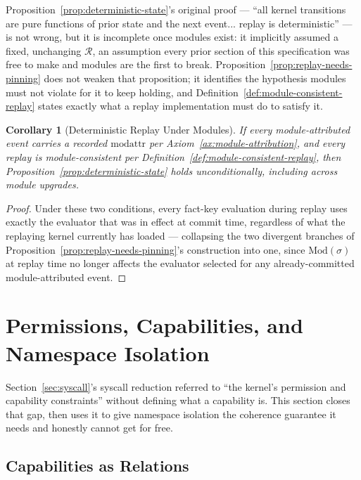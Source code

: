 \documentclass[11pt]{article}
\newtheorem{corollary}{Corollary}[section]
\begin{document}
Proposition~\ref{prop:deterministic-state}'s original proof --- ``all kernel transitions are pure functions of prior state and the next event... replay is deterministic'' --- is not wrong, but it is incomplete once modules exist: it implicitly assumed a fixed, unchanging $\mathcal{R}$, an assumption every prior section of this specification was free to make and modules are the first to break. Proposition~\ref{prop:replay-needs-pinning} does not weaken that proposition; it identifies the hypothesis modules must not violate for it to keep holding, and Definition~\ref{def:module-consistent-replay} states exactly what a replay implementation must do to satisfy it.

\begin{corollary}[Deterministic Replay Under Modules]
\label{cor:deterministic-under-modules}
If every module-attributed event carries a recorded $\mathrm{modattr}$ per Axiom~\ref{ax:module-attribution}, and every replay is module-consistent per Definition~\ref{def:module-consistent-replay}, then Proposition~\ref{prop:deterministic-state} holds unconditionally, including across module upgrades.
\end{corollary}
\begin{proof}
Under these two conditions, every fact-key evaluation during replay uses exactly the evaluator that was in effect at commit time, regardless of what the replaying kernel currently has loaded --- collapsing the two divergent branches of Proposition~\ref{prop:replay-needs-pinning}'s construction into one, since $\mathrm{Mod}(\sigma)$ at replay time no longer affects the evaluator selected for any already-committed module-attributed event.
\end{proof}

\section{Permissions, Capabilities, and Namespace Isolation}
\label{sec:permissions}

Section~\ref{sec:syscall}'s syscall reduction referred to ``the kernel's permission and capability constraints'' without defining what a capability is. This section closes that gap, then uses it to give namespace isolation the coherence guarantee it needs and honestly cannot get for free.

\subsection{Capabilities as Relations}
\end{document}
